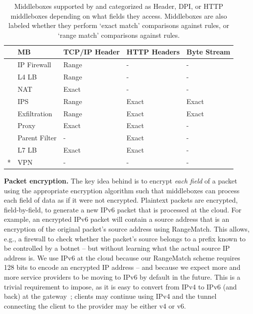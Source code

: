 \begin{table}
\centering
\small
\hspace{-2pt}
\begin{tabular}{l|l|p{.45in}|p{.45in}|p{.45in}}
&{\bf MB}&{\bf TCP/IP Header}&{\bf HTTP Headers}&{\bf Byte Stream}\\

\hline

\parbox[t]{1mm}{}
&IP Firewall&Range&-&-\\
&L4 LB&Range&-&-\\
&NAT&Exact&-&-\\
\hline


\parbox[t]{1mm}{}
&IPS&Range&Exact&Exact\\
&Exfiltration&Range&Exact&Exact\\
\hline

\parbox[t]{1mm}{}
&Proxy&Exact&Exact&-\\
&Parent Filter&-&Exact&-\\
&L7 LB&Exact&Exact&-\\
\hline
*&VPN&-&-&-\\

\end{tabular}
\caption[]{Middleboxes supported by \sys and categorized as Header, DPI, or HTTP middleboxes depending on what fields they access. Middleboxes are also labeled whether they perform `exact match' comparisons against rules, or `range match' comparisons against rules.\label{tbl:mbreqs}}

\end{table}



\noindent\textbf{Packet encryption.}
The key idea behind \sys is to encrypt {\it each field} of a packet using the appropriate encryption algorithm such that middleboxes can process each field of data as if it were not encrypted. 
Plaintext packets are encrypted, field-by-field, to generate a new IPv6 packet that is processed at the cloud.
For example, an encrypted IPv6 packet will contain a source address that is an encryption of the original packet's source address using RangeMatch. This allows, e.g., a firewall to check whether the packet's source belongs to a prefix known to be controlled by a botnet -- but without learning what the actual source IP address is.
We use IPv6 at the cloud because our RangeMatch scheme requires 128 bits to encode an encrypted IP address -- and because we expect more and more service providers to be moving to IPv6 by default in the future.
This is a trivial requirement to impose, as it is easy to convert from IPv4 to IPv6 (and back) at the gateway~\cite{6to4,4to6}; clients may continue using IPv4 and the tunnel connecting the client to the provider may be either v4 or v6.

